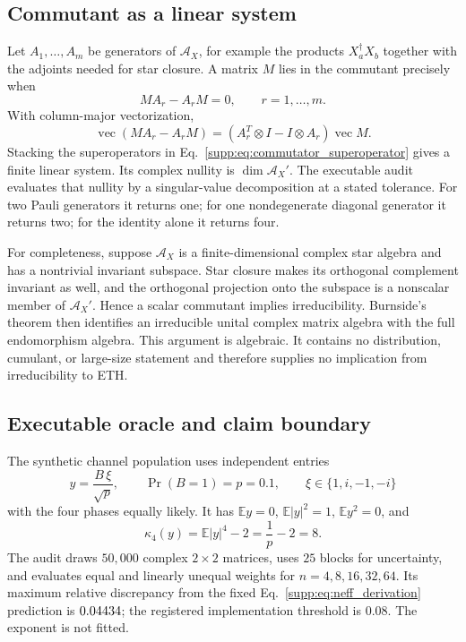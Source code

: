 \subsection{Commutant as a linear system}

Let $A_1,\ldots,A_m$ be generators of $\mathcal A_X$, for example the
products $X_a^\dagger X_b$ together with the adjoints needed for star closure.
A matrix $M$ lies in the commutant precisely when
\begin{equation}
 MA_r-A_rM=0,
 \qquad r=1,\ldots,m .
 \label{supp:eq:commutator_equations}
\end{equation}
With column-major vectorization,
\begin{equation}
 \operatorname{vec}(MA_r-A_rM)
 =\left(A_r^T\otimes I-I\otimes A_r\right)
 \operatorname{vec}M .
 \label{supp:eq:commutator_superoperator}
\end{equation}
Stacking the superoperators in
Eq.~\eqref{supp:eq:commutator_superoperator} gives a finite linear system.
Its complex nullity is $\dim\mathcal A_X'$.  The executable audit evaluates
that nullity by a singular-value decomposition at a stated tolerance.  For
two Pauli generators it returns one; for one nondegenerate diagonal generator
it returns two; for the identity alone it returns four.

For completeness, suppose $\mathcal A_X$ is a finite-dimensional complex
star algebra and has a nontrivial invariant subspace.  Star closure makes its
orthogonal complement invariant as well, and the orthogonal projection onto
the subspace is a nonscalar member of $\mathcal A_X'$.  Hence a scalar
commutant implies irreducibility.  Burnside's theorem then identifies an
irreducible unital complex matrix algebra with the full endomorphism algebra.
This argument is algebraic.  It contains no distribution, cumulant, or
large-size statement and therefore supplies no implication from
irreducibility to ETH.

\subsection{Executable oracle and claim boundary}

The synthetic channel population uses independent entries
\begin{equation}
 y=\frac{B\,\xi}{\sqrt p},
 \qquad
 \Pr(B=1)=p=0.1,
 \qquad
 \xi\in\{1,i,-1,-i\}
 \label{supp:eq:oracle_population}
\end{equation}
with the four phases equally likely.  It has
$\mathbb Ey=0$, $\mathbb E|y|^2=1$, $\mathbb Ey^2=0$, and
\begin{equation}
 \kappa_4(y)=\mathbb E|y|^4-2=\frac{1}{p}-2=8 .
 \label{supp:eq:oracle_kappa}
\end{equation}
The audit draws $50{,}000$ complex $2\times2$ matrices, uses $25$ blocks for
uncertainty, and evaluates equal and linearly unequal weights for
$n=4,8,16,32,64$.  Its maximum relative discrepancy from the fixed
Eq.~\eqref{supp:eq:neff_derivation} prediction is $0.04434$; the
registered implementation threshold is $0.08$.  The exponent is not fitted.

